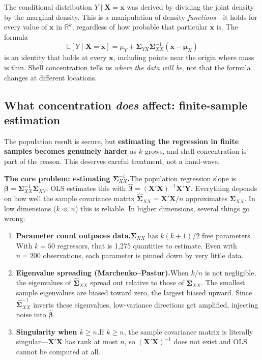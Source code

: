 \documentclass[11pt]{article}
\begin{document}
The conditional distribution $Y\mid \bm{X}=\bm{x}$ was derived by dividing the joint density by the marginal density.  This is a manipulation of density \emph{functions}---it holds for every value of $\bm{x}$ in $\mathbb{R}^k$, regardless of how probable that particular $\bm{x}$ is.  The formula
\[
\mathbb{E}[Y\mid \bm{X}=\bm{x}] = \mu_Y + \bm{\Sigma}_{YX}\bm{\Sigma}_{XX}^{-1}(\bm{x}-\bm{\mu}_X)
\]
is an identity that holds at every $\bm{x}$, including points near the origin where mass is thin.  Shell concentration tells us \emph{where the data will be}, not that the formula changes at different locations.

\subsection{What concentration \emph{does} affect: finite-sample estimation}

The population result is secure, but \textbf{estimating the regression in finite samples becomes genuinely harder} as $k$ grows, and shell concentration is part of the reason.  This deserves careful treatment, not a hand-wave.

\medskip\noindent
\textbf{The core problem: estimating $\bm{\Sigma}_{XX}^{-1}$.}\quad The population regression slope is $\bm{\beta} = \bm{\Sigma}_{XX}^{-1}\bm{\Sigma}_{XY}$.  OLS estimates this with $\hat{\bm{\beta}} = (\bm{X'X})^{-1}\bm{X'Y}$.  Everything depends on how well the sample covariance matrix $\hat{\bm{\Sigma}}_{XX} = \bm{X'X}/n$ approximates $\bm{\Sigma}_{XX}$.  In low dimensions ($k \ll n$) this is reliable.  In higher dimensions, several things go wrong:

\begin{enumerate}[leftmargin=2em]
\item \textbf{Parameter count outpaces data.}\quad $\bm{\Sigma}_{XX}$ has $k(k+1)/2$ free parameters.  With $k=50$ regressors, that is 1,275 quantities to estimate.  Even with $n=200$ observations, each parameter is pinned down by very little data.

\item \textbf{Eigenvalue spreading (Marchenko--Pastur).}\quad When $k/n$ is not negligible, the eigenvalues of $\hat{\bm{\Sigma}}_{XX}$ spread out relative to those of $\bm{\Sigma}_{XX}$.  The smallest sample eigenvalues are biased toward zero, the largest biased upward.  Since $\hat{\bm{\Sigma}}_{XX}^{-1}$ inverts these eigenvalues, low-variance directions get amplified, injecting noise into $\hat{\bm{\beta}}$.

\item \textbf{Singularity when $k \geq n$.}\quad If $k \geq n$, the sample covariance matrix is literally singular---$\bm{X'X}$ has rank at most $n$, so $(\bm{X'X})^{-1}$ does not exist and OLS cannot be computed at all.
\end{enumerate}
\end{document}

